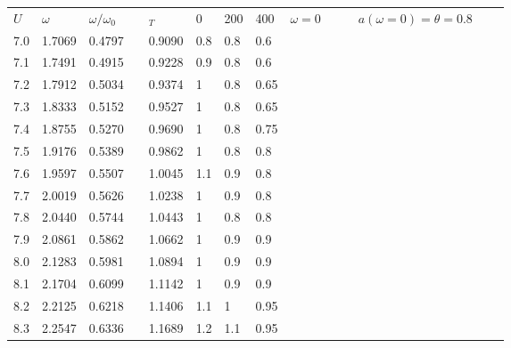 \begin{longtable}{|l|l|l|l|l|l|l|l|}
	\hline
	$U$        & $\omega$     & $\omega/\omega_0$ &  & $_T$                           & 0       & 200    & 400   \endfirsthead
	        & $\omega = 0$ &                   &  & $a(\omega = 0) = \theta = 0.8$ &         &        &                     \\
	7.0        & 1.7069       & 0.4797            &  & 0.9090                         & 0.8     & 0.8    & 0.6                 \\
	7.1        & 1.7491       & 0.4915            &  & 0.9228                         & 0.9     & 0.8    & 0.6                 \\
	7.2        & 1.7912       & 0.5034            &  & 0.9374                         & 1       & 0.8    & 0.65                \\
	7.3        & 1.8333       & 0.5152            &  & 0.9527                         & 1       & 0.8    & 0.65                \\
	7.4        & 1.8755       & 0.5270            &  & 0.9690                         & 1       & 0.8    & 0.75                \\
	7.5        & 1.9176       & 0.5389            &  & 0.9862                         & 1       & 0.8    & 0.8                 \\
	7.6        & 1.9597       & 0.5507            &  & 1.0045                         & 1.1     & 0.9    & 0.8                 \\
	7.7        & 2.0019       & 0.5626            &  & 1.0238                         & 1       & 0.9    & 0.8                 \\
	7.8        & 2.0440       & 0.5744            &  & 1.0443                         & 1       & 0.8    & 0.8                 \\
	7.9        & 2.0861       & 0.5862            &  & 1.0662                         & 1       & 0.9    & 0.9                 \\
	8.0        & 2.1283       & 0.5981            &  & 1.0894                         & 1       & 0.9    & 0.9                 \\
	8.1        & 2.1704       & 0.6099            &  & 1.1142                         & 1       & 0.9    & 0.9                 \\
	8.2        & 2.2125       & 0.6218            &  & 1.1406                         & 1.1     & 1      & 0.95                \\
	8.3        & 2.2547       & 0.6336            &  & 1.1689                         & 1.2     & 1.1    & 0.95                \\

\end{longtable}
